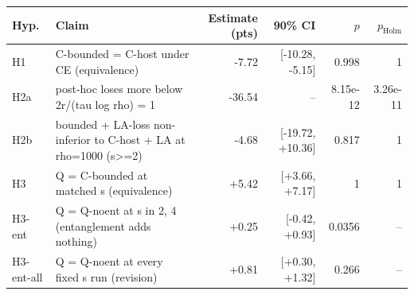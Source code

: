 \begin{tabular}{llrrrr}
\toprule
Hyp. & Claim & Estimate (pts) & 90\% CI & $p$ & $p_{\mathrm{Holm}}$ \\
\midrule
H1 & C-bounded = C-host under CE (equivalence) & -7.72 & [-10.28, -5.15] & 0.998 & 1 \\
H2a & post-hoc loses more below 2r/(tau log rho) = 1 & -36.54 & -- & 8.15e-12 & 3.26e-11 \\
H2b & bounded + LA-loss non-inferior to C-host + LA at rho=1000 (s>=2) & -4.68 & [-19.72, +10.36] & 0.817 & 1 \\
H3 & Q = C-bounded at matched s (equivalence) & +5.42 & [+3.66, +7.17] & 1 & 1 \\
H3-ent & Q = Q-noent at s in {2, 4} (entanglement adds nothing) & +0.25 & [-0.42, +0.93] & 0.0356 & -- \\
H3-ent-all & Q = Q-noent at every fixed s run (revision) & +0.81 & [+0.30, +1.32] & 0.266 & -- \\
\bottomrule
\end{tabular}